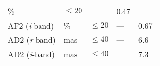 \documentclass[DM,toc]{lsstdoc}
\begin{document}
\begin{longtable}[]{@{}lllll@{}}
\begin{minipage}[t]{0.08\columnwidth}
\%\strut
\end{minipage} & \begin{minipage}[t]{0.20\columnwidth}\raggedright\strut
\(\leq 20\)\strut
\end{minipage} & \begin{minipage}[t]{0.22\columnwidth}\raggedright\strut
---\strut
\end{minipage} & \begin{minipage}[t]{0.17\columnwidth}\raggedright\strut
0.47\strut
\end{minipage}\tabularnewline
\begin{minipage}[t]{0.19\columnwidth}\raggedright\strut
AF2 (\emph{i}-band)\strut
\end{minipage} & \begin{minipage}[t]{0.08\columnwidth}\raggedright\strut
\%\strut
\end{minipage} & \begin{minipage}[t]{0.20\columnwidth}\raggedright\strut
\(\leq 20\)\strut
\end{minipage} & \begin{minipage}[t]{0.22\columnwidth}\raggedright\strut
---\strut
\end{minipage} & \begin{minipage}[t]{0.17\columnwidth}\raggedright\strut
0.67\strut
\end{minipage}\tabularnewline
\begin{minipage}[t]{0.19\columnwidth}\raggedright\strut
AD2 (\emph{r}-band)\strut
\end{minipage} & \begin{minipage}[t]{0.08\columnwidth}\raggedright\strut
mas\strut
\end{minipage} & \begin{minipage}[t]{0.20\columnwidth}\raggedright\strut
\(\leq 40\)\strut
\end{minipage} & \begin{minipage}[t]{0.22\columnwidth}\raggedright\strut
---\strut
\end{minipage} & \begin{minipage}[t]{0.17\columnwidth}\raggedright\strut
6.6\strut
\end{minipage}\tabularnewline
\begin{minipage}[t]{0.19\columnwidth}\raggedright\strut
AD2 (\emph{i}-band)\strut
\end{minipage} & \begin{minipage}[t]{0.08\columnwidth}\raggedright\strut
mas\strut
\end{minipage} & \begin{minipage}[t]{0.20\columnwidth}\raggedright\strut
\(\leq 40\)\strut
\end{minipage} & \begin{minipage}[t]{0.22\columnwidth}\raggedright\strut
---\strut
\end{minipage} & \begin{minipage}[t]{0.17\columnwidth}\raggedright\strut
7.3\strut
\end{minipage}\tabularnewline
\bottomrule
\end{longtable}
\end{document}
